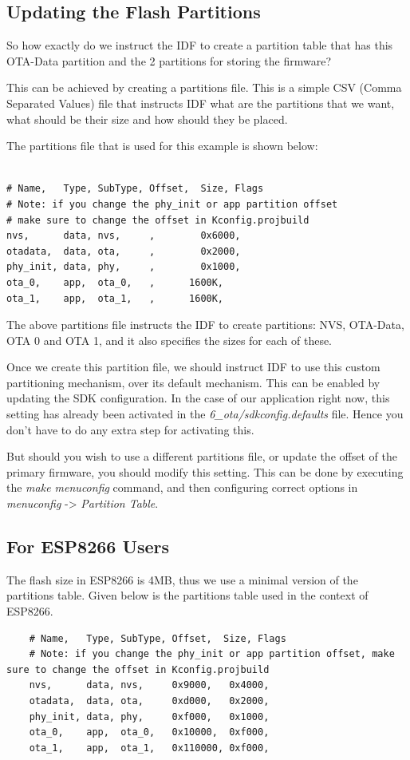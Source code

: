 \documentclass[main.tex]{subfiles}
\begin{document}
\subsection{Updating the Flash Partitions}\label{sec:updating_flash_partitions}
So how exactly do we instruct the IDF to create a partition table that has this OTA-Data partition and the 2 partitions for storing the firmware?

This can be achieved by creating a partitions file. This is a simple CSV (Comma Separated Values) file that instructs IDF what are the partitions that we want, what should be their size and how should they be placed.

The partitions file that is used for this example is shown below:
\begin{verbatim}

# Name,   Type, SubType, Offset,  Size, Flags
# Note: if you change the phy_init or app partition offset
# make sure to change the offset in Kconfig.projbuild
nvs,      data, nvs,     ,        0x6000,
otadata,  data, ota,     ,        0x2000,
phy_init, data, phy,     ,        0x1000,
ota_0,    app,  ota_0,   ,      1600K,
ota_1,    app,  ota_1,   ,      1600K,
\end{verbatim}

The above partitions file instructs the IDF to create partitions: NVS, OTA-Data, OTA 0 and OTA 1, and it also specifies the sizes for each of these.

Once we create this partition file, we should instruct IDF to use this custom partitioning mechanism, over its default mechanism. This can be enabled by updating the SDK configuration. In the case of our application right now, this setting has already been activated in the \textit{6\_ota/sdkconfig.defaults} file. Hence you don't have to do any extra step for activating this.

But should you wish to use a different partitions file, or update the offset of the primary firmware, you should modify this setting. This can be done by executing the \textit{make menuconfig} command, and then configuring correct options in \textit{menuconfig} -> \textit{Partition Table}.

\subsection{For ESP8266 Users}\label{sec:for_esp8266_users}
The flash size in ESP8266 is 4MB, thus we use a minimal version of the partitions table. Given below is the partitions table used in the context of ESP8266.
\begin{verbatim}
    # Name,   Type, SubType, Offset,  Size, Flags
    # Note: if you change the phy_init or app partition offset, make sure to change the offset in Kconfig.projbuild
    nvs,      data, nvs,     0x9000,   0x4000,
    otadata,  data, ota,     0xd000,   0x2000,
    phy_init, data, phy,     0xf000,   0x1000,
    ota_0,    app,  ota_0,   0x10000,  0xf000,
    ota_1,    app,  ota_1,   0x110000, 0xf000,
\end{verbatim}
\end{document}
